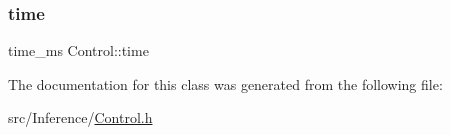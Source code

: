 \mbox{\label{struct_control_a273f3488d567bb10871e71245a406f3e}} 
\subsubsection{\texorpdfstring{time}{time}}
{\footnotesize\ttfamily time\+\_\+ms Control\+::time}



The documentation for this class was generated from the following file\+:\begin{DoxyCompactItemize}
\item 
src/\+Inference/\hyperlink{_control_8h}{Control.\+h}\end{DoxyCompactItemize}
